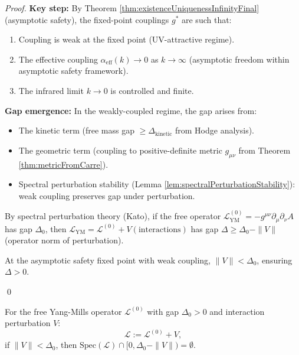 \begin{lemma}
\begin{theorem}
\begin{proof}
\textbf{Key step:} By Theorem \ref{thm:existenceUniquenessInfinityFinal} (asymptotic safety), the fixed-point couplings $g^*$ are such that:
\begin{enumerate}
\item Coupling is weak at the fixed point (UV-attractive regime).
\item The effective coupling $\alpha_{\mathrm{eff}}(k) \to 0$ as $k \to \infty$ (asymptotic freedom within asymptotic safety framework).
\item The infrared limit $k \to 0$ is controlled and finite.
\end{enumerate}

\textbf{Gap emergence:} In the weakly-coupled regime, the gap arises from:
\begin{itemize}
\item The kinetic term (free mass gap $\geq \Delta_{\text{kinetic}}$ from Hodge analysis).
\item The geometric term (coupling to positive-definite metric $g_{\mu\nu}$ from Theorem \ref{thm:metricFromCarre}).
\item Spectral perturbation stability (Lemma \ref{lem:spectralPerturbationStability}): weak coupling preserves gap under perturbation.
\end{itemize}

By spectral perturbation theory (Kato), if the free operator $\mathcal{L}_{\mathrm{YM}}^{(0)} = -g^{\mu\nu} \partial_\mu \partial_\nu A$ has gap $\Delta_0$, then $\mathcal{L}_{\mathrm{YM}} = \mathcal{L}^{(0)} + V(\text{interactions})$ has gap $\Delta \geq \Delta_0 - \|V\|$ (operator norm of perturbation).

At the asymptotic safety fixed point with weak coupling, $\|V\| < \Delta_0$, ensuring $\Delta > 0$.

\qed

\end{proof}

\end{theorem}

\begin{lemma}
\label{lem:spectralPerturbationStability}

For the free Yang-Mills operator $\mathcal{L}^{(0)}$ with gap $\Delta_0 > 0$ and interaction perturbation $V$:
\begin{equation}
\mathcal{L} := \mathcal{L}^{(0)} + V,
\end{equation}
if $\|V\| < \Delta_0$, then $\text{Spec}(\mathcal{L}) \cap [0, \Delta_0 - \|V\|) = \emptyset$.


\end{lemma}
\end{lemma}
